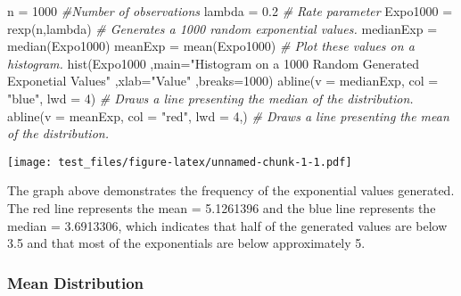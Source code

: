\documentclass[
]{article}
\newenvironment{Shaded}{\begin{snugshade}}{\end{snugshade}}
\newcommand{\AttributeTok}[1]{\textcolor[rgb]{0.77,0.63,0.00}{#1}}
\newcommand{\CommentTok}[1]{\textcolor[rgb]{0.56,0.35,0.01}{\textit{#1}}}
\newcommand{\DecValTok}[1]{\textcolor[rgb]{0.00,0.00,0.81}{#1}}
\newcommand{\FloatTok}[1]{\textcolor[rgb]{0.00,0.00,0.81}{#1}}
\newcommand{\FunctionTok}[1]{\textcolor[rgb]{0.00,0.00,0.00}{#1}}
\newcommand{\NormalTok}[1]{#1}
\newcommand{\OtherTok}[1]{\textcolor[rgb]{0.56,0.35,0.01}{#1}}
\newcommand{\StringTok}[1]{\textcolor[rgb]{0.31,0.60,0.02}{#1}}
\begin{document}
\begin{Shaded}
\begin{Highlighting}[]
\NormalTok{n }\OtherTok{=} \DecValTok{1000} \CommentTok{\#Number of observations}
\NormalTok{lambda }\OtherTok{=} \FloatTok{0.2} \CommentTok{\# Rate parameter}
\NormalTok{Expo1000 }\OtherTok{=} \FunctionTok{rexp}\NormalTok{(n,lambda) }\CommentTok{\# Generates a 1000 random exponential values.}
\NormalTok{medianExp }\OtherTok{=} \FunctionTok{median}\NormalTok{(Expo1000)}
\NormalTok{meanExp }\OtherTok{=} \FunctionTok{mean}\NormalTok{(Expo1000)}
\CommentTok{\# Plot these values on a histogram.}
\FunctionTok{hist}\NormalTok{(Expo1000}
\NormalTok{     ,}\AttributeTok{main=}\StringTok{"Histogram on a 1000 Random Generated Exponetial Values"}
\NormalTok{     ,}\AttributeTok{xlab=}\StringTok{"Value"}
\NormalTok{     ,}\AttributeTok{breaks=}\DecValTok{1000}\NormalTok{)}
\FunctionTok{abline}\NormalTok{(}\AttributeTok{v =}\NormalTok{ medianExp, }\AttributeTok{col =} \StringTok{"blue"}\NormalTok{, }\AttributeTok{lwd =} \DecValTok{4}\NormalTok{) }\CommentTok{\# Draws a line presenting the median of the distribution.}
\FunctionTok{abline}\NormalTok{(}\AttributeTok{v =}\NormalTok{ meanExp, }\AttributeTok{col =} \StringTok{"red"}\NormalTok{, }\AttributeTok{lwd =} \DecValTok{4}\NormalTok{,) }\CommentTok{\# Draws a line presenting the mean of the distribution.}
\end{Highlighting}
\end{Shaded}

\texttt{[image: test\_files/figure-latex/unnamed-chunk-1-1.pdf]}

The graph above demonstrates the frequency of the exponential values
generated. The red line represents the mean = 5.1261396 and the blue
line represents the median = 3.6913306, which indicates that half of the
generated values are below 3.5 and that most of the exponentials are
below approximately 5.

\hypertarget{mean-distribution}{%
\subsubsection{Mean Distribution}\label{mean-distribution}}
\end{document}
